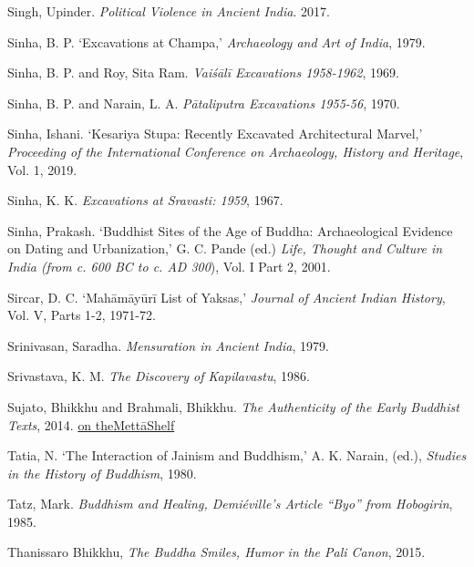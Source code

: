 \label{footprints_split_022.html_Singhux20Uux202017}
Singh, Upinder. \emph{Political Violence in Ancient India}. 2017.

\label{footprints_split_022.html_Sinhaux201979}
Sinha, B. P. `Excavations at Champa,' \emph{Archaeology and Art of
India}, 1979.

\label{footprints_split_022.html_Sinha-Royux201969}
Sinha, B. P. and Roy, Sita Ram. \emph{Vaiśālī Excavations 1958-1962},
1969.

Sinha, B. P. and Narain, L. A. \emph{Pātaliputra Excavations 1955-56},
1970.

\label{footprints_split_022.html_Sinhaux20Iux202019}
Sinha, Ishani. `Kesariya Stupa: Recently Excavated Architectural
Marvel,' \emph{Proceeding of the International Conference on
Archaeology, History and Heritage}, Vol. 1, 2019.

Sinha, K. K. \emph{Excavations at Sravasti: 1959}, 1967.

Sinha, Prakash. `Buddhist Sites of the Age of Buddha: Archaeological
Evidence on Dating and Urbanization,' G. C. Pande (ed.) \emph{Life,
Thought and Culture in India (from c. 600 BC to c. AD 300}), Vol. I Part
2, 2001.

\label{footprints_split_022.html_Sircarux201971}
Sircar, D. C. `Mahāmāyūrī List of Yaksas,' \emph{Journal of Ancient
Indian History}, Vol. V, Parts 1-2, 1971-72.

\label{footprints_split_022.html_Srinivasanux201979}
Srinivasan, Saradha. \emph{Mensuration in Ancient India}, 1979.

\label{footprints_split_022.html_Srivastavaux201986}
Srivastava, K. M. \emph{The Discovery of Kapilavastu}, 1986.

\label{footprints_split_022.html_Sujatoux20andux20Brahmaliux202014}
Sujato, Bhikkhu and Brahmali, Bhikkhu. \emph{\emph{The Authenticity of
the Early Buddhist Texts}}, 2014. \href{https://wiswo.org/books/auth}{on
theMettāShelf}

Tatia, N. `The Interaction of Jainism and Buddhism,' A. K. Narain,
(ed.), \emph{Studies in the History of Buddhism}, 1980.

\label{footprints_split_022.html_Tatzux201985}
Tatz, Mark. \emph{Buddhism and Healing, Demiéville's Article ``Byo''
from Hobogirin}, 1985.

\label{footprints_split_022.html_Thanissaroux202015}
Thanissaro Bhikkhu, \emph{The Buddha Smiles, Humor in the Pali Canon},
2015.


